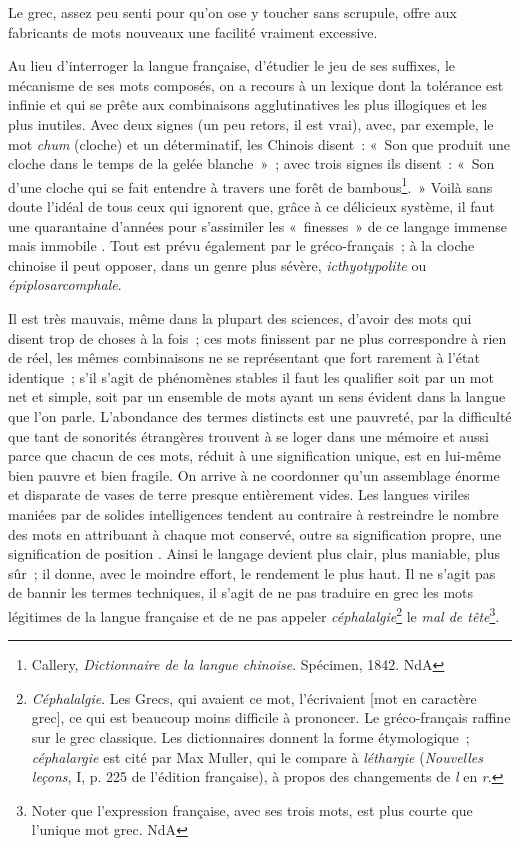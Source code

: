 \documentclass[french,twoside]{book} %
\newcommand\chaptercont{} %
\begin{document}
\chaptercont
\noindent Le grec, assez peu senti pour qu’on ose y toucher sans scrupule, offre aux fabricants de mots nouveaux une facilité vraiment excessive.\par
Au lieu d’interroger la langue française, d’étudier le jeu de ses suffixes, le mécanisme de ses mots composés, on a recours à un lexique dont la tolérance est infinie et qui se prête aux combinaisons agglutinatives les plus illogiques et les plus inutiles. Avec deux signes (un peu retors, il est vrai), avec, par exemple, le mot {\itshape chum} (cloche) et un déterminatif, les Chinois disent : « Son que produit une cloche dans le temps de la gelée blanche » ; avec trois signes ils disent : « Son d’une cloche qui se fait entendre à travers une forêt de bambous\footnote{Callery, {\itshape Dictionnaire de la langue chinoise}. Spécimen, 1842. NdA}. » Voilà sans doute l’idéal de tous ceux qui ignorent que, grâce à ce délicieux système, il faut une quarantaine d’années pour s’assimiler les « finesses » de ce langage immense mais immobile . Tout est prévu également par le gréco-français ; à la cloche chinoise il peut opposer, dans un genre plus sévère, {\itshape icthyotypolite} ou {\itshape épiplosarcomphale}.\par
Il est très mauvais, même dans la plupart des sciences, d’avoir des mots qui disent trop de choses à la fois ; ces mots finissent par ne plus correspondre à rien de réel, les mêmes combinaisons ne se représentant que fort rarement à l’état identique ; s’il s’agit de phénomènes stables il faut les qualifier soit par un mot net et simple, soit par un ensemble de mots ayant un sens évident dans la langue que l’on parle. L’abondance des termes distincts est une pauvreté, par la difficulté que tant de sonorités étrangères trouvent à se loger dans une mémoire et aussi parce que chacun de ces mots, réduit à une signification unique, est en lui-même bien pauvre et bien fragile. On arrive à ne coordonner qu’un assemblage énorme et disparate de vases de terre presque entièrement vides. Les langues viriles maniées par de solides intelligences tendent au contraire à restreindre le nombre des mots en attribuant à chaque mot conservé, outre sa signification propre, une signification de position . Ainsi le langage devient plus clair, plus maniable, plus sûr ; il donne, avec le moindre effort, le rendement le plus haut. Il ne s’agit pas de bannir les termes techniques, il s’agit de ne pas traduire en grec les mots légitimes de la langue française et de ne pas appeler {\itshape céphalalgie}\footnote{{\itshape Céphalalgie}. Les Grecs, qui avaient ce mot, l’écrivaient [mot en caractère grec], ce qui est beaucoup moins difficile à prononcer. Le gréco-français raffine sur le grec classique. Les dictionnaires donnent la forme étymologique ; {\itshape céphalargie} est cité par Max Muller, qui le compare à {\itshape léthargie} ({\itshape Nouvelles leçons}, I, p. 225 de l’édition française), à propos des changements de {\itshape l} en {\itshape r}.} le {\itshape mal de tête}\footnote{Noter que l’expression française, avec ses trois mots, est plus courte que l’unique mot grec. NdA}.\par
\end{document}
